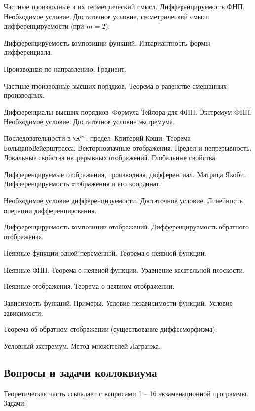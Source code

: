 \documentclass[a4paper]{article}
\begin{document}
\begin{nums}{-2}
\item Частные производные и их геометрический смысл. Дифференцируемость ФНП. Необходимое условие.
Достаточное условие, геометрический смысл дифференцируемости (при $m=2$).
\item Дифференцируемость композиции функций. Инвариантность формы дифференциала.
\item Производная по направлению. Градиент.
\item Частные производные высших порядков. Теорема о равенстве смешанных производных.
\item Дифференциалы высших порядков. Формула Тейлора для ФНП. Экстремум ФНП. Необходимое условие. Достаточное условие
экстремума.
\item Последовательности в $\R^m$, предел. Критерий Коши. Теорема Больцано\ч Вейерштрасса. Векторнозначные отображения.
Предел и непрерывность. Локальные свойства непрерывных отображений. Глобальные свойства.
\item Дифференцируемые отображения, производная, дифференциал.  Матрица Якоби. Дифференцируемость
отображения и его координат.
\item Необходимое условие дифференцируемости. Достаточное условие. Линейность операции дифференцирования.
\item Дифференцируемость композиции отображений. Дифференцируемость обратного отображения.
\item Неявные функции одной переменной. Теорема о неявной функции.
\item Неявные ФНП. Теорема о неявной функции. Уравнение касательной плоскости.
\item Неявные отображения. Теорема о неявном отображении.
\item Зависимость функций. Примеры. Условие независимости функций. Условие зависимости.
\item Теорема об обратном отображении (существование диффеоморфизма).
\item Условный экстремум. Метод множителей Лагранжа.
\end{nums}

\subsection{Вопросы и задачи коллоквиума}

Теоретическая часть совпадает с вопросами 1 -- 16 экзаменационной программы. Задачи:
\end{document}
